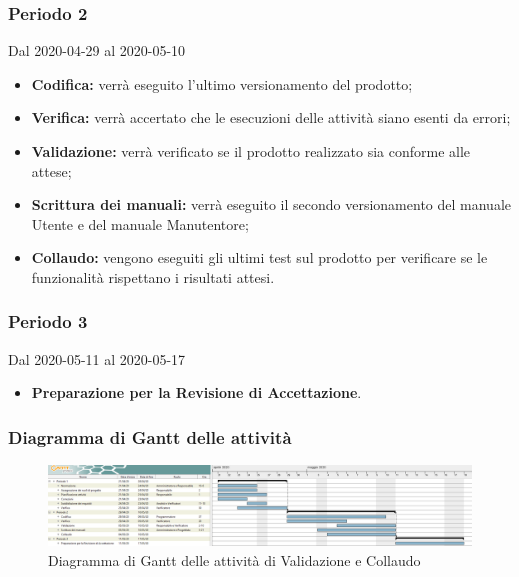 \subsubsection{Periodo 2} 
Dal 2020-04-29 al 2020-05-10
\begin{itemize}
	\item \textbf{Codifica:} verrà eseguito l'ultimo versionamento del prodotto;
	\item \textbf{Verifica:} verrà accertato che le esecuzioni delle attività siano esenti da errori;
	\item \textbf{Validazione:} verrà verificato se il prodotto realizzato sia conforme alle attese;
	\item \textbf{Scrittura dei manuali:} verrà eseguito il secondo versionamento del manuale Utente e del manuale Manutentore;
	\item \textbf{Collaudo:} vengono eseguiti gli ultimi test sul prodotto per verificare se le funzionalità rispettano i risultati attesi.
\end{itemize}
\subsubsection{Periodo 3} 
Dal 2020-05-11 al 2020-05-17
\begin{itemize}
	\item \textbf{Preparazione per la Revisione di Accettazione}.
\end{itemize}


\newpage
\begin{landscape}
	\subsubsection{Diagramma di Gantt delle attività}
	\pagestyle{empty}
	\begin{figure}[h]
		\caption{Diagramma di Gantt delle attività di Validazione e Collaudo}
		\begin{center}	
			\includegraphics[scale=1.6]{Sezioni/DiagrammiGantt/Validazione.png}
		\end{center}
		
	\end{figure}
\end{landscape}